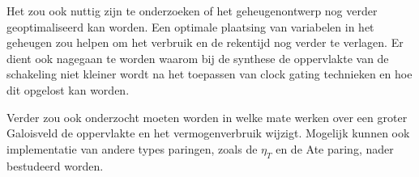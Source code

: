Het zou ook nuttig zijn te onderzoeken of het geheugenontwerp nog verder geoptimaliseerd kan worden. Een optimale plaatsing van variabelen in het geheugen zou helpen om het verbruik en de rekentijd nog verder te verlagen. Er dient ook nagegaan te worden waarom bij de synthese de oppervlakte van de schakeling niet kleiner wordt na het toepassen van clock gating technieken en hoe dit opgelost kan worden.

Verder zou ook onderzocht moeten worden in welke mate werken over een groter Galoisveld de oppervlakte en het vermogenverbruik wijzigt. Mogelijk kunnen ook implementatie van andere types paringen, zoals de $\eta_T$ en de Ate paring, nader bestudeerd worden.


